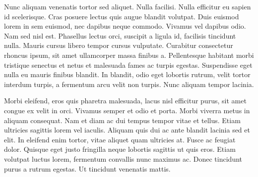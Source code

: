 \label{ch:introduction}

Nunc aliquam venenatis tortor sed aliquet. Nulla facilisi. Nulla efficitur eu sapien id scelerisque. Cras posuere lectus quis augue blandit volutpat. Duis euismod lorem in sem euismod, nec dapibus neque commodo. Vivamus vel dapibus odio. Nam sed nisl est. Phasellus lectus orci, suscipit a ligula id, facilisis tincidunt nulla. Mauris cursus libero tempor cursus vulputate. Curabitur consectetur rhoncus ipsum, sit amet ullamcorper massa finibus a. Pellentesque habitant morbi tristique senectus et netus et malesuada fames ac turpis egestas. Suspendisse eget nulla eu mauris finibus blandit. In blandit, odio eget lobortis rutrum, velit tortor interdum turpis, a fermentum arcu velit non turpis. Nunc aliquam tempor lacinia.

Morbi eleifend, eros quis pharetra malesuada, lacus nisl efficitur purus, sit amet congue ex velit in orci. Vivamus semper et odio et porta. Morbi viverra metus in aliquam consequat. Nam et diam ac dui tempus tempor vitae et tellus. Etiam ultricies sagittis lorem vel iaculis. Aliquam quis dui ac ante blandit lacinia sed et elit. In eleifend enim tortor, vitae aliquet quam ultricies at. Fusce ac feugiat dolor. Quisque eget justo fringilla neque lobortis sagittis ut quis eros. Etiam volutpat luctus lorem, fermentum convallis nunc maximus ac. Donec tincidunt purus a rutrum egestas. Ut tincidunt venenatis mattis.
